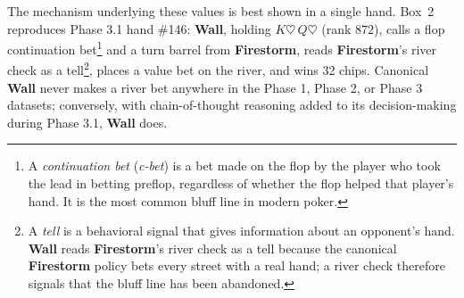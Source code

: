 \documentclass[10pt]{article} %
\newcommand{\arch}[1]{\textbf{#1}}
\begin{document}


The mechanism underlying these values is best shown in a single
hand. Box~2 reproduces Phase 3.1 hand \#146: \arch{Wall}, holding
$K\heartsuit\,Q\heartsuit$ (rank $872$), calls a flop continuation
bet\footnote{A \textit{continuation bet}
(\textit{c-bet}) is a bet made on the flop by the player who
took the lead in betting preflop, regardless of whether the
flop helped that player's hand. It is the most common bluff line
in modern poker.} and a turn barrel from \arch{Firestorm}, reads
\arch{Firestorm}'s river check as a tell\footnote{A
\textit{tell} is a behavioral signal that gives information
about an opponent's hand. \arch{Wall} reads \arch{Firestorm}'s
river check as a tell because the canonical \arch{Firestorm}
policy bets every street with a real hand; a river check
therefore signals that the bluff line has been abandoned.}, places
a value bet on the river, and wins 32 chips. Canonical \arch{Wall}
never makes a river bet anywhere in the Phase 1, Phase 2, or Phase 3
datasets; conversely, with chain-of-thought reasoning added to its
decision-making during Phase 3.1, \arch{Wall} does.
\end{document}
